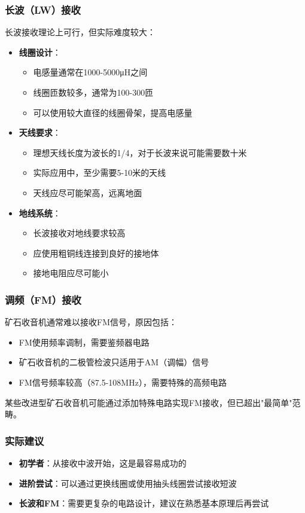 \documentclass[12pt,UTF8]{ctexbook}
\begin{document}
\subsubsection{长波（LW）接收}
长波接收理论上可行，但实际难度较大：
\begin{itemize}[leftmargin=3.5em]
    \item \textbf{线圈设计}：
    \begin{itemize}[leftmargin=3.5em]
        \item 电感量通常在1000-5000μH之间
        \item 线圈匝数较多，通常为100-300匝
        \item 可以使用较大直径的线圈骨架，提高电感量
    \end{itemize}
    \item \textbf{天线要求}：
    \begin{itemize}[leftmargin=3.5em]
        \item 理想天线长度为波长的1/4，对于长波来说可能需要数十米
        \item 实际应用中，至少需要5-10米的天线
        \item 天线应尽可能架高，远离地面
    \end{itemize}
    \item \textbf{地线系统}：
    \begin{itemize}[leftmargin=3.5em]
        \item 长波接收对地线要求较高
        \item 应使用粗铜线连接到良好的接地体
        \item 接地电阻应尽可能小
    \end{itemize}
\end{itemize}

\subsubsection{调频（FM）接收}
矿石收音机通常难以接收FM信号，原因包括：
\begin{itemize}[leftmargin=3.5em]
    \item FM使用频率调制，需要鉴频器电路
    \item 矿石收音机的二极管检波只适用于AM（调幅）信号
    \item FM信号频率较高（87.5-108MHz），需要特殊的高频电路
\end{itemize}

某些改进型矿石收音机可能通过添加特殊电路实现FM接收，但已超出"最简单"范畴。

\subsubsection{实际建议}
\begin{itemize}[leftmargin=3.5em]
    \item \textbf{初学者}：从接收中波开始，这是最容易成功的
    \item \textbf{进阶尝试}：可以通过更换线圈或使用抽头线圈尝试接收短波
    \item \textbf{长波和FM}：需要更复杂的电路设计，建议在熟悉基本原理后再尝试
\end{itemize}
\end{document}
